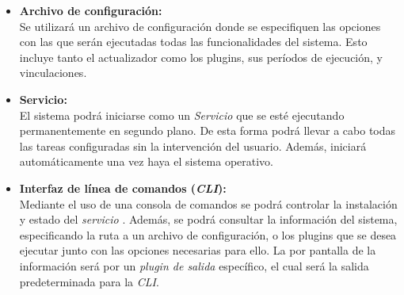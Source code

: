 \begin{itemize}
            \item \textbf{Archivo de configuración:} \\
                Se utilizará un archivo de configuración donde se especifiquen las opciones con las que serán ejecutadas todas las funcionalidades del sistema. Esto incluye tanto el actualizador como los plugins, sus períodos de ejecución, y vinculaciones.
                
            \item \textbf{Servicio:} \\
                El sistema podrá iniciarse como un \textit{Servicio} que se esté ejecutando permanentemente en segundo plano. De esta forma podrá llevar a cabo todas las tareas configuradas sin la intervención del usuario. Además, iniciará automáticamente una vez haya  el sistema operativo.
                
            \item \textbf{Interfaz de línea de comandos (\textit{CLI}):} \\
                Mediante el uso de una consola de comandos se podrá controlar la instalación y estado del \textit{servicio} . Además, se podrá consultar la información del sistema, especificando la ruta a un archivo de configuración, o los plugins que se desea ejecutar junto con las opciones necesarias para ello. La  por pantalla de la información será  por un \textit{plugin de salida} específico, el cual será la salida predeterminada para la \textit{CLI}. 
        \end{itemize}


\cleardoublepage


    